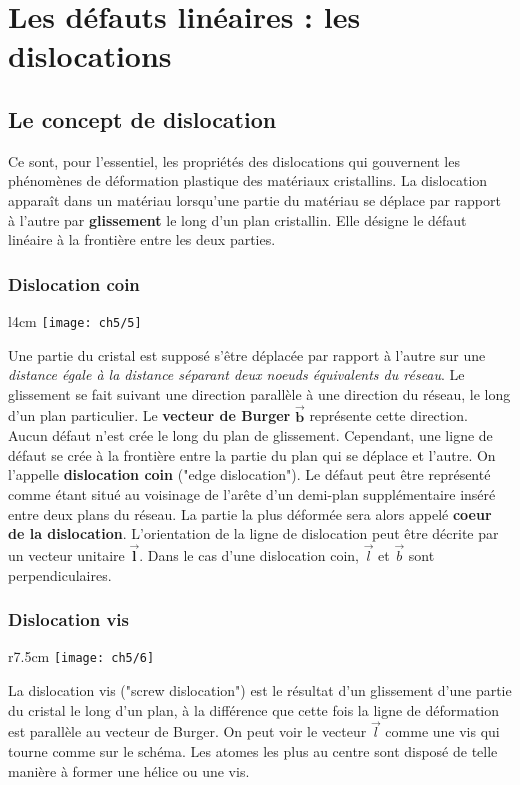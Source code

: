 \section{Les défauts linéaires : les dislocations}
	\subsection{Le concept de dislocation}
	Ce sont, pour l'essentiel, les propriétés des dislocations qui gouvernent les phénomènes de déformation plastique des matériaux cristallins. La dislocation apparaît dans un matériau lorsqu'une partie du matériau se déplace par rapport à l'autre par \textbf{glissement} le long d'un plan cristallin. Elle désigne le défaut linéaire à la frontière entre les deux parties. 
	
	\newpage
	\subsubsection{Dislocation coin}
	\begin{wrapfigure}[12]{l}{4cm}
	\vspace{-5mm}
	\texttt{[image: ch5/5]}
	\end{wrapfigure}
	Une partie du cristal est supposé s'être déplacée par rapport à l'autre sur une \textit{distance égale à la distance séparant deux noeuds équivalents du réseau}. Le glissement se fait suivant une direction parallèle à une direction du réseau, le long d'un plan particulier. Le \textbf{vecteur de Burger} $\mathbf{\vec{b}}$ représente cette direction. Aucun défaut n'est crée le long du plan de glissement. Cependant, une ligne de défaut se crée à la frontière entre la partie du plan qui se déplace et l'autre. On l'appelle \textbf{dislocation coin} ("edge dislocation"). Le défaut peut être représenté comme étant situé au voisinage de l'arête d'un demi-plan supplémentaire inséré entre deux plans du réseau. La partie la plus déformée sera alors appelé \textbf{coeur de la dislocation}. L'orientation de la ligne de dislocation peut être décrite par un vecteur unitaire $\mathbf{\vec{l}}$. Dans le cas d'une dislocation coin, $\vec{l}$ et $\vec{b}$ sont perpendiculaires.
	
	\subsubsection{Dislocation vis}
	\begin{wrapfigure}[7]{r}{7.5cm}
	\vspace{-5mm}
	\texttt{[image: ch5/6]}
	\end{wrapfigure}
	La dislocation vis ("screw dislocation") est le résultat d'un glissement d'une partie du cristal le long d'un plan, à la différence que cette fois la ligne de déformation est parallèle au vecteur de Burger. On peut voir le vecteur $\vec{l}$ comme une vis qui tourne comme sur le schéma. Les atomes les plus au centre sont disposé de telle manière à former une hélice ou une vis. 
	
